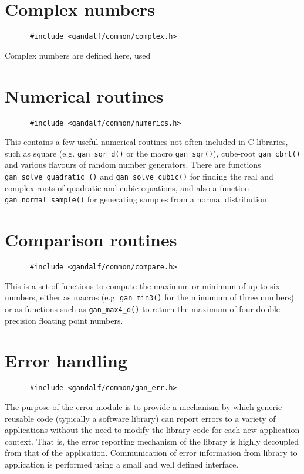\section{Complex numbers} \label{complex-sec}
\begin{verbatim}
      #include <gandalf/common/complex.h>
\end{verbatim}
Complex numbers are defined here, used 

\section{Numerical routines} \label{numerics-sec}
\begin{verbatim}
      #include <gandalf/common/numerics.h>
\end{verbatim}
This contains a few useful numerical routines not often included in
C libraries, such as square (e.g. {\tt gan\_sqr\_d()} or the macro
{\tt gan\_sqr()}),
cube-root {\tt gan\_cbrt()} and various flavours of random number
generators. There are functions {\tt gan\_solve\_quadratic ()} and
{\tt gan\_solve\_cubic()} for finding the real and complex roots
of quadratic and cubic equations,
and also a function {\tt gan\_normal\_sample()} for
generating samples from a normal distribution.


\section{Comparison routines} \label{compare-sec}
\begin{verbatim}
      #include <gandalf/common/compare.h>
\end{verbatim}
This is a set of functions to compute the maximum or minimum of up to
six numbers, either as macros (e.g. {\tt gan\_min3()} for the minumum of
three numbers) or as functions such as {\tt gan\_max4\_d()} to return the
maximum of four double precision floating point numbers.

\section{Error handling} \label{error-handling-sec}
\begin{verbatim}
      #include <gandalf/common/gan_err.h>
\end{verbatim}
The purpose of the error module is to provide a
mechanism by which generic reusable code (typically a software library) can
report errors to a variety of applications without the need to
modify the library code for each new application context. That is,
the error reporting mechanism of the library is highly decoupled
from that of the application. Communication of error information
from library to application is performed using a small and well
defined interface.

